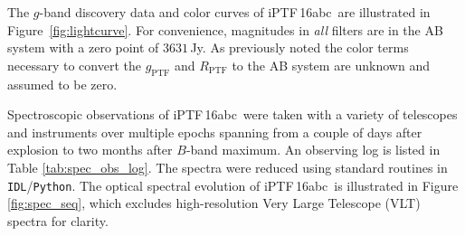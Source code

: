 \documentclass[twocolumn]{aastex61}
\newcommand{\abc}{iPTF\,16abc}
\begin{document}
The $g$-band discovery data and color curves of \abc\ are 
illustrated in Figure~\ref{fig:lightcurve}.  For convenience, 
magnitudes in 
\textit{all} filters are in the AB system with a zero point of 
$3631$\,Jy. As previously noted the color terms necessary to convert the $g_\mathrm{PTF}$ and $R_\mathrm{PTF}$ to the AB system are unknown and assumed to be zero.

Spectroscopic observations of \abc\ were taken with a variety
of telescopes and instruments over multiple epochs spanning from a
couple of days after explosion to two months after $B$-band maximum. 
An observing log is listed in Table \ref{tab:spec_obs_log}. The spectra were reduced using standard routines in \texttt{IDL}/\texttt{Python}. The optical
spectral evolution of \abc\ is illustrated in Figure
\ref{fig:spec_seq}, which excludes high-resolution Very Large Telescope (VLT) spectra for clarity.
\end{document}
